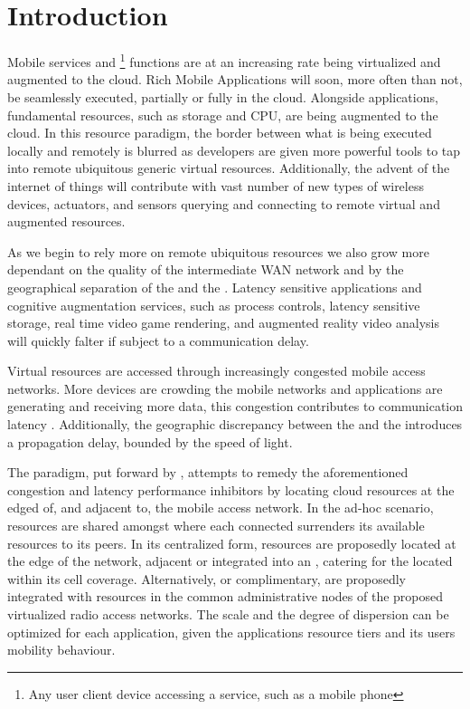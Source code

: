 \section{Introduction}

Mobile services and \ue{} \footnote{Any user client device accessing a service, such as a mobile phone} functions are at an increasing rate being virtualized and augmented to the cloud. Rich Mobile Applications \cite{March2011618} will soon, more often than not, be seamlessly executed, partially or fully in the cloud. Alongside applications, fundamental \ue{} resources, such as storage and CPU, are being augmented to the cloud. In this resource paradigm, the border between what is being executed locally and remotely is blurred as developers are given more powerful tools to tap into remote ubiquitous generic virtual resources. Additionally, the advent of the internet of things will contribute with vast number of new types of wireless devices, actuators, and sensors querying and connecting to remote virtual and augmented resources. 


As we begin to rely more on remote ubiquitous resources we also grow more dependant on the quality of the  intermediate WAN network and by the geographical separation of the \ue{} and the \dc{} \cite{choi2007analysis}. Latency sensitive applications and cognitive augmentation services, such as process controls, latency sensitive storage, real time video game rendering, and augmented reality video analysis will quickly falter if subject to a  communication delay.

Virtual resources are accessed through increasingly congested mobile access networks. More devices are crowding the mobile networks and applications are generating and receiving more data, this congestion contributes to communication latency \cite{hu2005measurement}. Additionally, the geographic discrepancy between the \ue{} and the \dc{} introduces a propagation delay, bounded by the speed of light.

The \xcloud{} paradigm, put forward by \cite{chandra2013decentralized,ericsson_akami,satyanarayanan2009case,kiukkonen2010towards,March2011618}, attempts to remedy the aforementioned congestion and latency performance inhibitors by locating cloud resources at the edged of, and adjacent to, the mobile access network. In the ad-hoc scenario, resources are shared amongst \ues{} where each connected \ue{} surrenders its available resources to its peers. In its centralized form, \dc{} resources are proposedly located at the edge of the network, adjacent or integrated into an \rbs{}, catering for the \ues{} located within its cell coverage. Alternatively, or complimentary, \dcs{} are proposedly integrated with resources in the common administrative nodes of the proposed virtualized radio access networks. The scale and the degree of dispersion can be optimized for each application, given the applications resource tiers and its users mobility behaviour.

